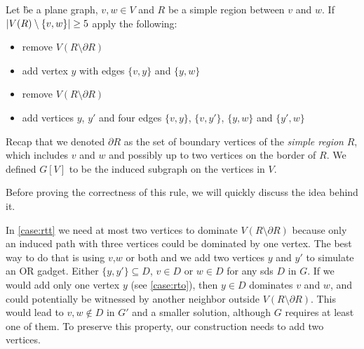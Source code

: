 \begin{rgl}\label{rgl:rthree}
    Let \G be a plane graph, $v, w \in V$ and $R$ be a simple region between $v$ and $w$. If $\abs{V(R) \setminus \{v, w\}} \geq 5$ apply the following:

    \begin{caseof}

            \vspace{-5mm}
            \begin{itemize}
                    \item remove $V(R\setminus\partial R)$
                    \item add vertex $y$ with edges $\{v, y\}$ and $\{y, w\}$
            \end{itemize}

            \vspace{-5mm}
            \begin{itemize}
                    \item remove $V(R\setminus\partial R)$
                    \item add vertices $y$, $y'$ and four edges $\{v,y\}$, $\{v, y'\}$, $\{y, w\}$ and $\{y', w\}$
            \end{itemize}
        \end{caseof}
Recap that we denoted $\partial R$ as the set of boundary vertices of the  \textit{simple region} $R$, which includes $v$ and $w$ and possibly up to two vertices on the border of $R$. 
We defined $G[V]$ to be the induced subgraph on the vertices in $V$.

\end{rgl}
Before proving the correctness of this rule, we will quickly discuss the idea behind it.

In \cref{case:rtt} we need at most two vertices to dominate $V(R \setminus \partial R)$ because only an induced path with three vertices could be dominated by one vertex.
The best way to do that is using $v$,$w$ or both and we add two vertices $y$ and $y'$ to simulate an $\mathrm{OR}$ gadget.
Either $\{y,y'\} \subseteq D$, $v \in D$ or $w \in D$ for any sds $D$ in $G$.
If we would add only one vertex $y$ (see \cref{case:rto}), then $y \in D$ dominates $v$ and $w$, and could potentially be witnessed by another neighbor outside $V(R \setminus \partial R)$.
This would lead to $v,w \notin D$ in $G'$ and a smaller solution, although $G$ requires at least one of them.
To preserve this property, our construction needs to add two vertices.

